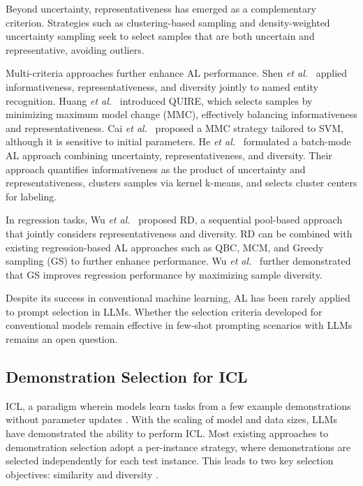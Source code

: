\documentclass[journal,twocolumn]{IEEEtran}
\begin{document}
Beyond uncertainty, representativeness has emerged as a complementary criterion. Strategies such as clustering-based sampling \cite{nguyen2004active} and density-weighted uncertainty sampling \cite{Settles2008b} seek to select samples that are both uncertain and representative, avoiding outliers.

Multi-criteria approaches further enhance AL performance. Shen \textit{et al.}~\cite{Shen2004a} applied informativeness, representativeness, and diversity jointly to named entity recognition. Huang \textit{et al.}~\cite{huang2010active} introduced QUIRE, which selects samples by minimizing maximum model change (MMC), effectively balancing informativeness and representativeness. Cai \textit{et al.}~\cite{Cai2014} proposed a MMC strategy tailored to SVM, although it is sensitive to initial parameters. He \textit{et al.}~\cite{He2014} formulated a batch-mode AL approach combining uncertainty, representativeness, and diversity. Their approach quantifies informativeness as the product of uncertainty and representativeness, clusters samples via kernel k-means, and selects cluster centers for labeling.

In regression tasks, Wu \textit{et al.}~\cite{wu2018pool}  proposed RD, a sequential pool-based approach that jointly considers representativeness and diversity. RD can be combined with existing regression-based AL approaches such as QBC, MCM, and Greedy sampling (GS) to further enhance performance. Wu \textit{et al.}~\cite{drwuiGS2019} further demonstrated that GS improves regression performance by maximizing sample diversity.

Despite its success in conventional machine learning, AL has been rarely applied to prompt selection in LLMs. Whether the selection criteria developed for conventional models remain effective in few-shot prompting scenarios with LLMs remains an open question.

\subsection{Demonstration Selection for ICL}
ICL, a paradigm wherein models learn tasks from a few example demonstrations without parameter updates \cite{dong-etal-2024-survey, achiam2023gpt}. With the scaling of model and data sizes, LLMs have demonstrated the ability to perform ICL. Most existing approaches to demonstration selection adopt a per-instance strategy, where demonstrations are selected independently for each test instance. This leads to two key selection objectives: similarity and diversity \cite{luo2024context}.
\end{document}
